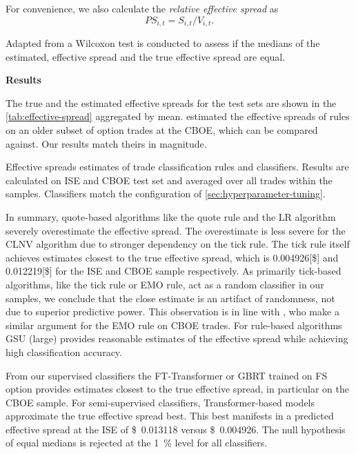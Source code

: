 For convenience, we also calculate the \emph{relative effective spread} as
\begin{equation}
    {PS}_{i,t} = S_{i,t} / V_{i,t}.
\end{equation}

Adapted from \textcite[][158]{theissenTestAccuracyLee2001} a Wilcoxon test is conducted to assess if the medians of the estimated, effective spread and the true effective spread are equal.

\textbf{Results}

The true and the estimated effective spreads for the test sets are shown in the \cref{tab:effective-spread} aggregated by mean. \textcite[][896--897]{savickasInferringDirectionOption2003} estimated the effective spreads of rules on an older subset of option trades at the \gls{CBOE}, which can be compared against. Our results match theirs in magnitude.

\begin{table}[!ht]
    \centering
    
    \caption[Effective Spreads Estimates]{Effective spreads estimates of trade classification rules and classifiers. Results are calculated on \gls{ISE} and \gls{CBOE} test set and averaged over all trades within the samples. Classifiers match the configuration of \cref{sec:hyperparameter-tuning}.}
    \label{tab:effective-spread}
\end{table}

In summary, quote-based algorithms like the quote rule and the \gls{LR} algorithm severely overestimate the effective spread. The overestimate is less severe for the \gls{CLNV} algorithm due to stronger dependency on the tick rule. The tick rule itself achieves estimates closest to the true effective spread, which is \num[round-mode=places, round-precision=3]{0.004926}[\$]{} and \num[round-mode=places, round-precision=3]{0.012219}[\$]{} for the \gls{ISE} and \gls{CBOE} sample respectively. As primarily tick-based algorithms, like the tick rule or \gls{EMO} rule, act as a random classifier in our samples, we conclude that the close estimate is an artifact of randomness, not due to superior predictive power. This observation is in line with \textcite[][897]{savickasInferringDirectionOption2003}, who make a similar argument for the \gls{EMO} rule on \gls{CBOE} trades. For rule-based algorithms \gls{GSU} (large) provides reasonable estimates of the effective spread while achieving high classification accuracy.

From our supervised classifiers the FT-Transformer or \gls{GBRT} trained on \gls{FS} option provides estimates closest to the true effective spread, in particular on the \gls{CBOE} sample. For semi-supervised classifiers, Transformer-based models approximate the true effective spread best. This best manifests in a predicted effective spread at the \gls{ISE} of \SI[round-mode=places, round-precision=3]{0.013118}[\$]{} versus \SI[round-mode=places, round-precision=3]{0.004926}[\$]{}. The null hypothesis of equal medians is rejected at the \SI{1}{\percent} level for all classifiers.

